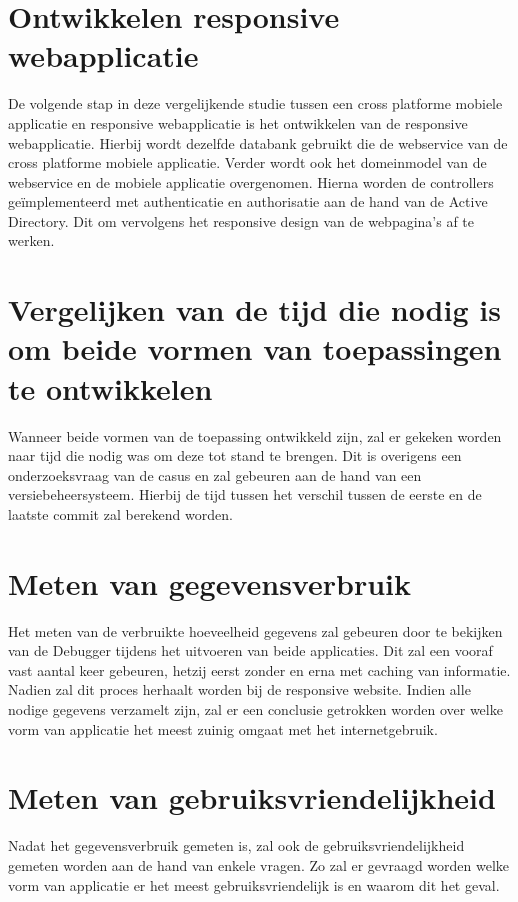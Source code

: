 \section{Ontwikkelen responsive webapplicatie}
De volgende stap in deze vergelijkende studie tussen een cross platforme mobiele applicatie en responsive webapplicatie is het
ontwikkelen van de responsive webapplicatie. Hierbij wordt dezelfde databank gebruikt die de webservice van de cross platforme
mobiele applicatie. Verder wordt ook het domeinmodel van de webservice en de mobiele applicatie overgenomen. Hierna worden de controllers
geïmplementeerd met authenticatie en authorisatie aan de hand van de Active Directory.
Dit om vervolgens het responsive design van de webpagina's af te werken.

\section{Vergelijken van de tijd die nodig is om beide vormen van toepassingen te ontwikkelen}
Wanneer beide vormen van de toepassing ontwikkeld zijn, zal er gekeken worden naar tijd die nodig was om deze tot stand te brengen.
Dit is overigens een onderzoeksvraag van de casus en zal gebeuren aan de hand van een versiebeheersysteem.
Hierbij de tijd tussen het verschil tussen de eerste en de laatste commit zal berekend worden.

\section{Meten van gegevensverbruik}
Het meten van de verbruikte hoeveelheid gegevens zal gebeuren door te bekijken van de Debugger tijdens het uitvoeren van beide
applicaties. Dit zal een vooraf vast aantal keer gebeuren, hetzij eerst zonder en erna met caching van informatie.
Nadien zal dit proces herhaalt worden bij de responsive website. Indien alle nodige gegevens verzamelt zijn, zal er een conclusie
getrokken worden over welke vorm van applicatie het meest zuinig omgaat met het internetgebruik.

\section{Meten van gebruiksvriendelijkheid}
Nadat het gegevensverbruik gemeten is, zal ook de gebruiksvriendelijkheid gemeten worden aan de hand van enkele vragen.
Zo zal er gevraagd worden welke vorm van applicatie er het meest gebruiksvriendelijk is en waarom dit het geval.

